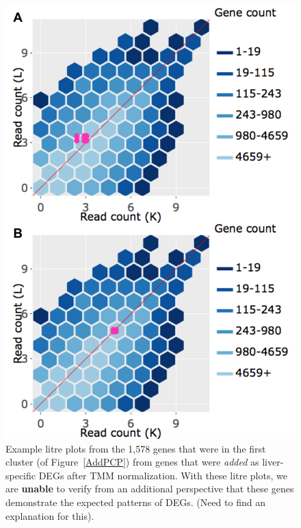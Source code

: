 \documentclass{article}
\begin{document}
\null
\begin{figure}[t!]
\centerline{\includegraphics[width=0.7\columnwidth]{../Dashboards/exampleAdd.png}}
\caption{Example litre plots from the 1,578 genes that were in the first cluster (of Figure~\ref{AddPCP}) from genes that were \textit{added} as liver-specific DEGs after TMM normalization. With these litre plots, we are \textbf{unable} to verify from an additional perspective that these genes demonstrate the expected patterns of DEGs. (Need to find an explanation for this).
\label{AddLitre}}
\end{figure}
\end{document}
